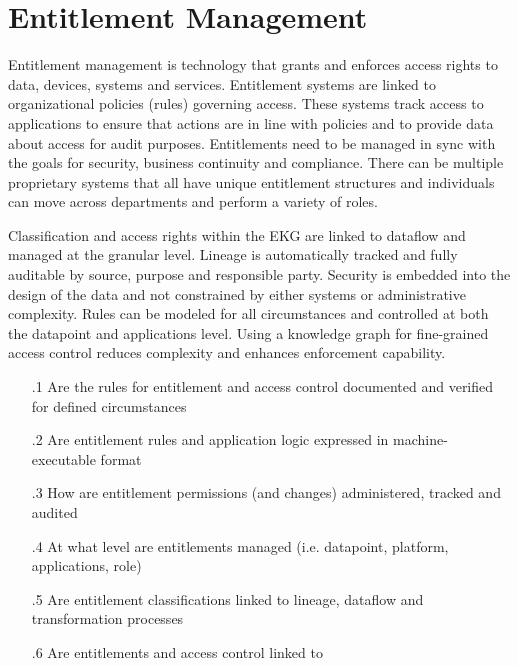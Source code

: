 \section{Entitlement Management}\label{sec:ekgmm-b-4-4} %

Entitlement management is technology that grants and enforces access rights to data, devices, systems and services.
Entitlement systems are linked to organizational policies (rules) governing access.
These systems track access to applications to ensure that actions are in line with policies and to provide data about access for audit purposes.
Entitlements need to be managed in sync with the goals for security, business continuity and compliance.
There can be multiple proprietary systems that all have unique entitlement structures and individuals can move across departments and perform a variety of roles.

\kgmmekgrationalesection

Classification and access rights within the EKG are linked to dataflow and managed at the granular level.  Lineage is automatically tracked and fully auditable by source, purpose and responsible party.  Security is embedded into the design of the data and not constrained by either systems or administrative complexity.  Rules can be modeled for all circumstances and controlled at both the datapoint and applications level.  Using a knowledge graph for fine-grained access control reduces complexity and enhances enforcement capability.

\kgmmcorequestionssection

\begin{itemize}[leftmargin=.5in]
  \item [\thesection.1] Are the rules for entitlement and access control documented and verified for defined circumstances
  \item [\thesection.2] Are entitlement rules and application logic expressed in machine-executable format
  \item [\thesection.3] How are entitlement permissions (and changes) administered, tracked and audited
  \item [\thesection.4] At what level are entitlements managed (i.e. datapoint, platform, applications, role)
  \item [\thesection.5] Are entitlement classifications linked to lineage, dataflow and transformation processes
  \item [\thesection.6] Are entitlements and access control linked to 
\end{itemize}
